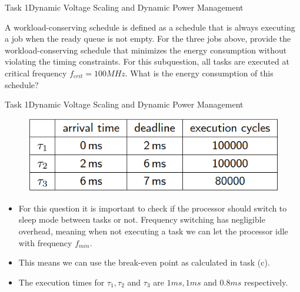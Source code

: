 \begin{frame}{Task 1}{Dynamic Voltage Scaling and Dynamic Power Management}
    \begin{tasknoinc}
      A workload-conserving schedule is deﬁned as a schedule that is always executing a job when the ready queue is not empty. For the three jobs above, provide the workload-conserving schedule that minimizes the energy consumption without violating the timing constraints. For this subquestion, all tasks are executed at critical frequency $f_{crit} = 100 MHz$. What is the energy consumption of this schedule?
    \end{tasknoinc}
\end{frame}
\begin{frame}{Task 1}{Dynamic Voltage Scaling and Dynamic Power Management}
    \begin{solutionnoinc}
        \begin{figure}
            \centering
            \includegraphics[scale=0.5]{figures/jobsToExecute.PNG}
        \end{figure}
        \begin{itemize}
            \item For this question it is important to check if the processor should switch to sleep mode between tasks or not. Frequency switching has negligible overhead, meaning when not executing a task we can let the processor idle with frequency $f_{min}$.
            \item This means we can use the break-even point as calculated in task (c).
            \item The execution times for $\tau_1, \tau_2$ and $\tau_3$ are $1ms, 1ms$ and $0.8ms$ respectively.
        \end{itemize}
    \end{solutionnoinc}
\end{frame}
